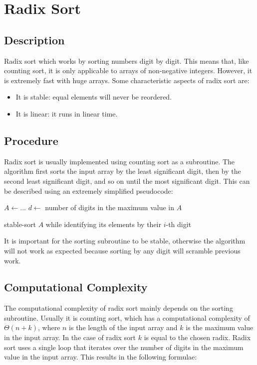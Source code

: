 \section{Radix Sort}

\subsection{Description}

Radix sort which works by sorting numbers digit by digit. This means that, like counting sort, it is only applicable to arrays of non-negative integers. However, it is extremely fast with huge arrays. Some characteristic aspects of radix sort are:

\begin{itemize}
    \item It is stable: equal elements will never be reordered.
    \item It is linear: it runs in linear time.
\end{itemize}

\subsection{Procedure}

Radix sort is usually implemented using counting sort as a subroutine. The algorithm first sorts the input array by the least significant digit, then by the second least significant digit, and so on until the most significant digit. This can be described using an extremely simplified pseudocode:

\begin{algorithmic}[1]
    \State $A \gets ...$
    \State $d \gets$ number of digits in the maximum value in $A$

     \label{radix:loop}
        \State stable-sort $A$ while identifying its elements by their $i$-th digit
    \EndFor
\end{algorithmic}

It is important for the sorting subroutine to be stable, otherwise the algorithm will not work as expected because sorting by any digit will scramble previous work.

\subsection{Computational Complexity}

The computational complexity of radix sort mainly depends on the sorting subroutine. Usually it is counting sort, which has a computational complexity of $\Theta(n + k)$, where $n$ is the length of the input array and $k$ is the maximum value in the input array. In the case of radix sort $k$ is equal to the chosen radix. Radix sort uses a single loop that iterates over the number of digits in the maximum value in the input array. This results in the following formulae:

